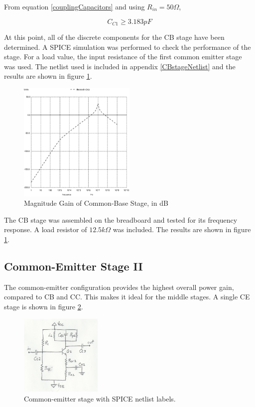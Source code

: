\documentclass[titlepage, letterpaper, 11pt]{article}
\begin{document}
From equation \ref{couplingCapacitors} and using $R_{in}=50\Omega$,

\begin{equation*}
C_{C1}\geq 3.183pF
\end{equation*}

At this point, all of the discrete components for the CB stage have
been determined. A SPICE simulation was performed to check the
performance of the stage. For a load value, the input resistance of
the first common emitter stage was used. The netlist used is included
in appendix \ref{CBstageNetlist} and the results are shown in figure
\ref{CBstageMagnitudePlot}.

\begin{figure}[ht]
	\centering
	\includegraphics[width=0.5\textwidth]
		{ngspice/CBstage.eps}
	\caption{
		Magnitude Gain of Common-Base Stage, in dB
	}
	\label{CBstageMagnitudePlot}
\end{figure}

The CB stage was assembled on the breadboard and tested for its
frequency response. A load resistor of $12.5k\Omega$ was included.
The results are shown in figure \ref{CBstageMagnitudePlot}.

\subsection{Common-Emitter Stage II}
\label{stage2section}

The common-emitter configuration provides the highest overall power
gain, compared to CB and CC. This makes it ideal for the middle
stages. A single CE stage is shown in figure 
\ref{commonEmitterStage}.

\begin{figure}[ht]
	\centering
	\includegraphics[width=0.35\textwidth]
		{figures/commonEmitterStage}
	\caption{
		Common-emitter stage with SPICE netlist labels.
	}
	\label{commonEmitterStage}
\end{figure}
\end{document}

